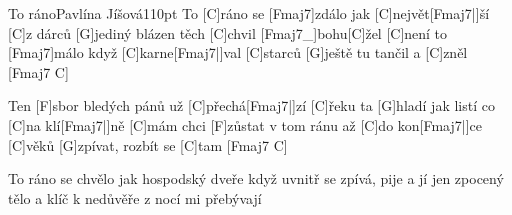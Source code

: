 \begin{song}{To ráno}{Pavlína Jíšová}{110pt}
%
To [C]ráno se [Fmaj7]zdálo jak [C]největ[Fmaj7|]{ší} [C]z dárců
[G]jediný blázen těch [C]chvil [Fmaj7_]{bohu}[C]{ž}el
[C]není to [Fmaj7]málo když [C]karne[Fmaj7|]{val} [C]starců
[G]ještě tu tančil a [C]zněl [Fmaj7 C]{}

\chorus%
Ten [F]sbor bledých pánů už [C]přechá[Fmaj7|]{zí} [C]{ř}eku
ta [G]hladí jak listí co [C]na klí[Fmaj7|]{ně} [C]mám 
chci [F]zůstat v tom ránu až [C]do kon[Fmaj7|]{ce} [C]věků
[G]zpívat, rozbít se [C]tam [Fmaj7 C]{}

%
To ráno se chvělo jak hospodský dveře
když uvnitř se zpívá, pije a jí 
jen zpocený tělo a klíč k nedůvěře
z nocí mi přebývají
\repchor\enspace{}
\end{song}
